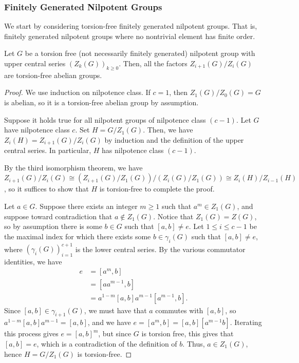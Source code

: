 \documentclass[10pt]{mypackage}
\begin{document}
\subsubsection{Finitely Generated Nilpotent Groups}%
We start by considering torsion-free finitely generated nilpotent groups. That is, finitely generated nilpotent groups where no nontrivial element has finite order.
\begin{lemma}
  Let $G$ be a torsion free (not necessarily finitely generated) nilpotent group with upper central series $\left( Z_k(G) \right)_{k\geq 0}$. Then, all the factors $Z_{i+1}(G)/Z_i(G)$ are torsion-free abelian groups.
\end{lemma}
\begin{proof}
  We use induction on nilpotence class. If $c = 1$, then $Z_1(G) / Z_0(G) = G$ is abelian, so it is a torsion-free abelian group by assumption.

  Suppose it holds true for all nilpotent groups of nilpotence class $\left( c-1 \right)$. Let $G$ have nilpotence class $c$. Set $H = G/Z_1(G)$. Then, we have $Z_i(H) = Z_{i+1}(G)/Z_i(G)$ by induction and the definition of the upper central series. In particular, $H$ has nilpotence class $\left( c-1 \right)$.

  By the third isomorphism theorem, we have $Z_{i+1}(G)/Z_i(G)\cong \left( Z_{i+1}(G)/Z_1(G) \right)/\left( Z_i(G)/Z_1(G) \right) \cong Z_i(H)/Z_{i-1}(H)$, so it suffices to show that $H$ is torsion-free to complete the proof.

  Let $a\in G$. Suppose there exists an integer $m\geq 1$ such that $a^{m}\in Z_1(G)$, and suppose toward contradiction that $a\notin Z_1(G)$. Notice that $Z_1(G) = Z(G)$, so by assumption there is some $b\in G$ such that $\left[ a,b \right]\neq e$. Let $1\leq i \leq c-1$ be the maximal index for which there exists some $b\in \gamma_i(G)$ such that $\left[ a,b \right]\neq e$, where $\left( \gamma_i(G) \right)_{i=1}^{c+1}$ is the lower central series. By the various commutator identities, we have
  \begin{align*}
    e &= \left[ a^{m},b \right]\\
      &= \left[ aa^{m-1},b \right]\\
      &= a^{1-m} \left[ a,b \right]a^{m-1} \left[ a^{m-1},b \right].
  \end{align*}
  Since $\left[ a,b \right]\in \gamma_{i+1}(G)$, we must have that $a$ commutes with $\left[ a,b \right]$, so $a^{1-m}\left[ a,b \right]a^{m-1} = \left[ a,b \right]$, and we have $e = \left[ a^{m},b \right] = \left[ a,b \right]\left[ a^{m-1}b \right]$. Iterating this process gives $e = \left[ a,b \right]^{m}$, but since $G$ is torsion free, this gives that $\left[ a,b \right] = e$, which is a contradiction of the definition of $b$. Thus, $a\in Z_1(G)$, hence $H = G/Z_1(G)$ is torsion-free.
\end{proof}
\end{document}
